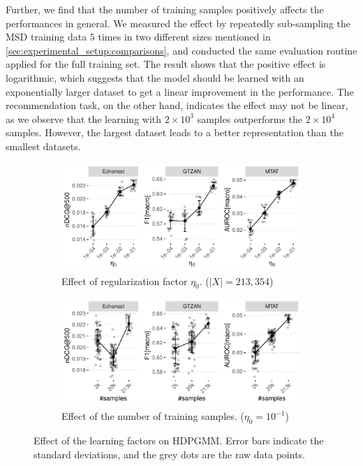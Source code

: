 \documentclass{article}
\begin{document}
Further, we find that the number of training samples positively affects the performances in general. We measured the effect by repeatedly sub-sampling the MSD training data $5$ times in two different sizes mentioned in \ref{sec:experimental_setup:comparisons}, and conducted the same evaluation routine applied for the full training set. The result shows that the positive effect is logarithmic, which suggests that the model should be learned with an exponentially larger dataset to get a linear improvement in the performance. The recommendation task, on the other hand, indicates the effect may not be linear, as we observe that the learning with $2\times10^{3}$ samples outperforms the $2\times10^{4}$ samples. However, the largest dataset leads to a better representation than the smallest datasets.
\begin{figure}[h]
    \begin{subfigure}{\linewidth}    
        \centering
        \includegraphics[width=\linewidth]{figs/regularization_effect.pdf}
        \caption{Effect of regularization factor $\eta_{0}$. ($|X| = 213,354$)}
        \label{fig:effects:regularization_effect}
    \end{subfigure}

    \begin{subfigure}{\linewidth}
        \centering
        \includegraphics[width=\linewidth]{figs/num_sample_effect.pdf}
        \caption{Effect of the number of training samples. ($\eta_{0} = 10^{-1}$)}
        \label{fig:effects:num_samples_effect}
    \end{subfigure}
    \caption{Effect of the learning factors on HDPGMM. Error bars indicate the standard deviations, and the grey dots are the raw data points.}
    \vspace{-0.5cm}
    \label{fig:effects}
\end{figure}
\end{document}
